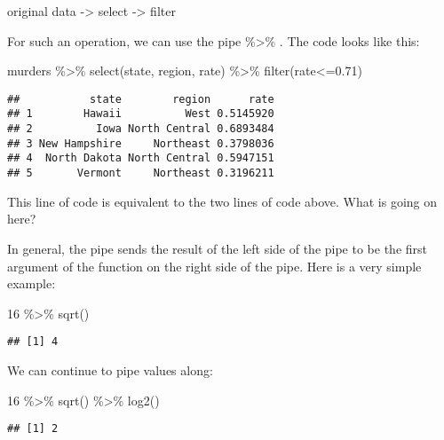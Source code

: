\documentclass[
]{article}
\newenvironment{Shaded}{\begin{snugshade}}{\end{snugshade}}
\newcommand{\DecValTok}[1]{\textcolor[rgb]{0.00,0.00,0.81}{#1}}
\newcommand{\FloatTok}[1]{\textcolor[rgb]{0.00,0.00,0.81}{#1}}
\newcommand{\FunctionTok}[1]{\textcolor[rgb]{0.00,0.00,0.00}{#1}}
\newcommand{\NormalTok}[1]{#1}
\newcommand{\SpecialCharTok}[1]{\textcolor[rgb]{0.00,0.00,0.00}{#1}}
\begin{document}
original data -\textgreater{} select -\textgreater{} filter

For such an operation, we can use the pipe \%\textgreater\% . The code
looks like this:

\begin{Shaded}
\begin{Highlighting}[]
\NormalTok{murders }\SpecialCharTok{\%\textgreater{}\%}  \FunctionTok{select}\NormalTok{(state, region, rate) }\SpecialCharTok{\%\textgreater{}\%}  \FunctionTok{filter}\NormalTok{(rate}\SpecialCharTok{\textless{}=}\FloatTok{0.71}\NormalTok{)}
\end{Highlighting}
\end{Shaded}

\begin{verbatim}
##           state        region      rate
## 1        Hawaii          West 0.5145920
## 2          Iowa North Central 0.6893484
## 3 New Hampshire     Northeast 0.3798036
## 4  North Dakota North Central 0.5947151
## 5       Vermont     Northeast 0.3196211
\end{verbatim}

This line of code is equivalent to the two lines of code above. What is
going on here?

In general, the pipe sends the result of the left side of the pipe to be
the first argument of the function on the right side of the pipe. Here
is a very simple example:

\begin{Shaded}
\begin{Highlighting}[]
\DecValTok{16} \SpecialCharTok{\%\textgreater{}\%} \FunctionTok{sqrt}\NormalTok{()}
\end{Highlighting}
\end{Shaded}

\begin{verbatim}
## [1] 4
\end{verbatim}

We can continue to pipe values along:

\begin{Shaded}
\begin{Highlighting}[]
\DecValTok{16} \SpecialCharTok{\%\textgreater{}\%} \FunctionTok{sqrt}\NormalTok{() }\SpecialCharTok{\%\textgreater{}\%} \FunctionTok{log2}\NormalTok{()}
\end{Highlighting}
\end{Shaded}

\begin{verbatim}
## [1] 2
\end{verbatim}
\end{document}
